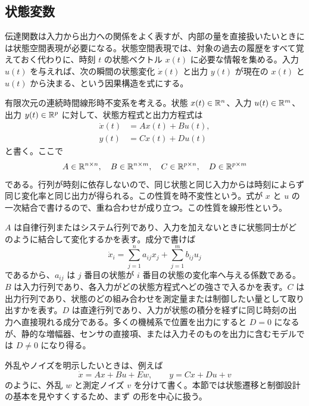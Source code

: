 \subsection{状態変数}

伝達関数は入力から出力への関係をよく表すが、内部の量を直接扱いたいときには状態空間表現が必要になる。状態空間表現では、対象の過去の履歴をすべて覚えておく代わりに、時刻 $t$ の状態ベクトル $x(t)$ に必要な情報を集める。入力 $u(t)$ を与えれば、次の瞬間の状態変化 $\dot{x}(t)$ と出力 $y(t)$ が現在の $x(t)$ と $u(t)$ から決まる、という因果構造を式にする。

有限次元の連続時間線形時不変系を考える。状態 $x(t)\in\mathbb{R}^n$、入力 $u(t)\in\mathbb{R}^m$、出力 $y(t)\in\mathbb{R}^p$ に対して、状態方程式と出力方程式は
\begin{align}
  \dot{x}(t)&=Ax(t)+Bu(t),\\
  y(t)&=Cx(t)+Du(t)
  \label{eq:ss}
\end{align}
と書く。ここで
\begin{equation}
  A\in\mathbb{R}^{n\times n},\quad
  B\in\mathbb{R}^{n\times m},\quad
  C\in\mathbb{R}^{p\times n},\quad
  D\in\mathbb{R}^{p\times m}
\end{equation}
である。行列が時刻に依存しないので、同じ状態と同じ入力からは時刻によらず同じ変化率と同じ出力が得られる。この性質を時不変性という。式が $x$ と $u$ の一次結合で書けるので、重ね合わせが成り立つ。この性質を線形性という。

$A$ は自律行列またはシステム行列であり、入力を加えないときに状態同士がどのように結合して変化するかを表す。成分で書けば
\begin{equation}
  \dot{x}_i=\sum_{j=1}^{n}a_{ij}x_j+\sum_{j=1}^{m}b_{ij}u_j
\end{equation}
であるから、$a_{ij}$ は $j$ 番目の状態が $i$ 番目の状態の変化率へ与える係数である。$B$ は入力行列であり、各入力がどの状態方程式へどの強さで入るかを表す。$C$ は出力行列であり、状態のどの組み合わせを測定量または制御したい量として取り出すかを表す。$D$ は直達行列であり、入力が状態の積分を経ずに同じ時刻の出力へ直接現れる成分である。多くの機械系で位置を出力にすると $D=0$ になるが、静的な増幅器、センサの直接項、または入力そのものを出力に含むモデルでは $D\ne0$ になり得る。

外乱やノイズを明示したいときは、例えば
\begin{equation}
  \dot{x}=Ax+Bu+Ew,\qquad y=Cx+Du+v
\end{equation}
のように、外乱 $w$ と測定ノイズ $v$ を分けて書く。本節では状態遷移と制御設計の基本を見やすくするため、まず  の形を中心に扱う。

